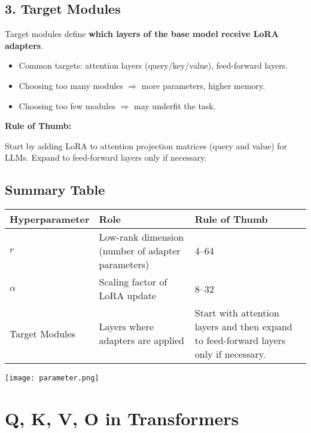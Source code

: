 \documentclass[a4paper, 12pt]{article}
\begin{document}
\subsection*{3. Target Modules}
Target modules define \textbf{which layers of the base model receive LoRA adapters}.  

\begin{itemize}
    \item Common targets: attention layers (query/key/value), feed-forward layers.  
    \item Choosing too many modules $\Rightarrow$ more parameters, higher memory.  
    \item Choosing too few modules $\Rightarrow$ may underfit the task.
\end{itemize}

\textbf{Rule of Thumb:}  
\begin{tcolorbox}[colback=yellow!5!white,colframe=yellow!75!black]
Start by adding LoRA to attention projection matrices (query and value) for LLMs. Expand to feed-forward layers only if necessary.
\end{tcolorbox}

\subsection*{Summary Table}

\begin{tcolorbox}[colback=gray!5!white,colframe=black,title=LoRA Hyperparameters Summary]
\begin{tabular}{|p{4cm}|p{5cm}|p{6cm}|}
\hline
\textbf{Hyperparameter} & \textbf{Role} & \textbf{Rule of Thumb} \\
\hline
$r$ & Low-rank dimension (number of adapter parameters) & 4--64 \\
\hline
$\alpha$ & Scaling factor of LoRA update & 8--32 \\
\hline
Target Modules & Layers where adapters are applied & Start with attention layers and then expand to feed-forward layers only if necessary. \\
\hline
\end{tabular}
\end{tcolorbox}


\texttt{[image: parameter.png]}
\newpage
\section*{Q, K, V, O in Transformers}
\end{document}
